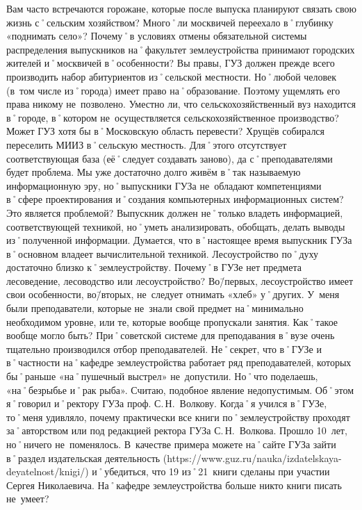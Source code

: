 \begin{drama}
	\pagebreak
	
	\maxspeaks Вам часто встречаются горожане, которые после выпуска планируют связать свою жизнь с˚сельским хозяйством? Много˚ли москвичей переехало в˚глубинку  «поднимать село»? Почему˚в условиях отмены обязательной системы распределения выпускников на˚факультет землеустройства принимают городских жителей и˚москвичей в˚особенности? 
	\michaelspeaks Вы правы, ГУЗ должен прежде всего производить набор абитуриентов из˚сельской местности. Но˚любой человек (в~том числе из˚города) имеет право на˚образование. Поэтому ущемлять его права никому не~позволено. 
	\maxspeaks Уместно ли, что сельскохозяйственный вуз находится в˚городе, в˚котором не~осуществляется сельскохозяйственное производство? Может ГУЗ хотя бы в˚Московскую область перевести?
	\michaelspeaks Хрущёв собирался переселить МИИЗ в˚сельскую местность. Для˚этого отсутствует соответствующая база (её˚следует создавать заново), да с˚преподавателями будет проблема.
	\maxspeaks Мы уже достаточно долго живём в˚так называемую информационную эру, но˚выпускники ГУЗа не~обладают компетенциями в˚сфере проектирования и˚создания компьютерных информационных систем? Это является проблемой?
	\michaelspeaks Выпускник должен не˚только владеть информацией, соответствующей техникой, но˚уметь анализировать, обобщать, делать выводы из˚полученной информации. Думается, что в˚настоящее время выпускник ГУЗа в˚основном владеет вычислительной техникой.
	\maxspeaks Лесоустройство по˚духу достаточно близко к˚землеустройству. Почему˚в ГУЗе нет предмета лесоведение, лесоводство или лесоустройство?
	\michaelspeaks Во\=/первых, лесоустройство имеет свои особенности, во\=/вторых, не~следует отнимать «хлеб» у˚других.
	\maxspeaks У~меня были преподаватели, которые не~знали свой предмет на˚минимально необходимом уровне, или те, которые вообще пропускали занятия. Как˚такое вообще могло быть? 
	\michaelspeaks При˚советской системе для преподавания в˚вузе очень тщательно производился отбор преподавателей. Не˚секрет, что в˚ГУЗе и в˚частности на˚кафедре землеустройства работает ряд преподавателей, которых бы˚раньше «на˚пушечный выстрел» не~допустили. Но˚что поделаешь, «на˚безрыбье и˚рак рыба». Считаю, подобное явление недопустимым. Об˚этом я˚говорил и˚ректору ГУЗа проф. С.\,Н.~Волкову.
	\maxspeaks Когда˚я учился в˚ГУЗе, то˚меня удивляло, почему практически все книги по˚землеустройству проходят за˚авторством или под редакцией ректора ГУЗа С.\,Н.~Волкова. Прошло 10~лет, но˚ничего не~поменялось. В~качестве примера можете на˚сайте ГУЗа зайти в˚раздел издательская деятельность (https://www.guz.ru/nauka/izdatelskaya-deyatelnost/knigi/) и˚убедиться, что 19 из˚21~книги сделаны при участии Сергея Николаевича. На˚кафедре землеустройства больше никто книги писать не~умеет? 

\end{drama}

